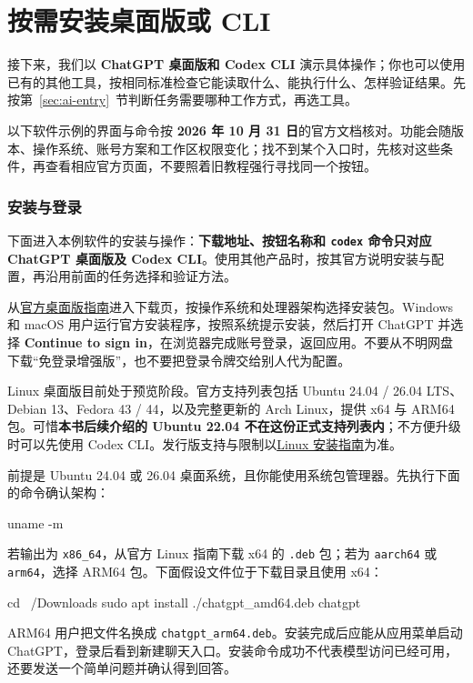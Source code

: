 \section{按需安装桌面版或 CLI}
\label{sec:ai-desktop}

接下来，我们以 \textbf{ChatGPT 桌面版和 Codex CLI} 演示具体操作；你也可以使用已有的其他工具，按相同标准检查它能读取什么、能执行什么、怎样验证结果。先按第~\ref{sec:ai-entry}~节判断任务需要哪种工作方式，再选工具。

以下软件示例的界面与命令按 \textbf{2026 年 10 月 31 日}的官方文档核对。功能会随版本、操作系统、账号方案和工作区权限变化；找不到某个入口时，先核对这些条件，再查看相应官方页面，不要照着旧教程强行寻找同一个按钮。

\subsubsection{安装与登录}

下面进入本例软件的安装与操作：\textbf{下载地址、按钮名称和 \texttt{codex} 命令只对应 ChatGPT 桌面版及 Codex CLI}。使用其他产品时，按其官方说明安装与配置，再沿用前面的任务选择和验证方法。

从\href{https://learn.chatgpt.com/docs/app}{官方桌面版指南}进入下载页，按操作系统和处理器架构选择安装包。Windows 和 macOS 用户运行官方安装程序，按照系统提示安装，然后打开 ChatGPT 并选择 \textbf{Continue to sign in}，在浏览器完成账号登录，返回应用。不要从不明网盘下载“免登录增强版”，也不要把登录令牌交给别人代为配置。

Linux 桌面版目前处于预览阶段。官方支持列表包括 Ubuntu 24.04 / 26.04 LTS、Debian 13、Fedora 43 / 44，以及完整更新的 Arch Linux，提供 x64 与 ARM64 包。可惜\textbf{本书后续介绍的 Ubuntu 22.04 不在这份正式支持列表内}；不方便升级时可以先使用 Codex CLI。发行版支持与限制以\href{https://learn.chatgpt.com/docs/linux/linux-app}{Linux 安装指南}为准。

\begin{example}
前提是 Ubuntu 24.04 或 26.04 桌面系统，且你能使用系统包管理器。先执行下面的命令确认架构：
\begin{tbash}
uname -m
\end{tbash}
若输出为 \texttt{x86\_64}，从官方 Linux 指南下载 x64 的 \texttt{.deb} 包；若为 \texttt{aarch64} 或 \texttt{arm64}，选择 ARM64 包。下面假设文件位于下载目录且使用 x64：
\begin{tbash}
cd ~/Downloads
sudo apt install ./chatgpt_amd64.deb
chatgpt
\end{tbash}
ARM64 用户把文件名换成 \texttt{chatgpt\_arm64.deb}。安装完成后应能从应用菜单启动 ChatGPT，登录后看到新建聊天入口。安装命令成功不代表模型访问已经可用，还要发送一个简单问题并确认得到回答。
\end{example}

